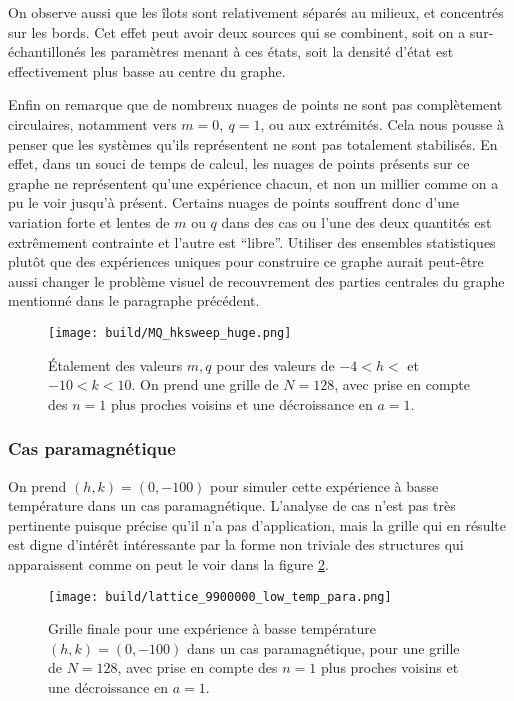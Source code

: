 \documentclass[a4paper, 11pt]{article}
\begin{document}
On observe aussi que les îlots sont relativement séparés au milieux, et concentrés sur les bords.
Cet effet peut avoir deux sources qui se combinent, soit on a sur-échantillonés les paramètres
menant à ces états, soit la densité d'état est effectivement plus basse au centre du graphe. 

Enfin on remarque que de nombreux nuages de points  ne sont pas complètement circulaires,  notamment
vers $m=0, ~q=1$, ou aux extrémités. Cela nous pousse à penser que les systèmes qu'ils représentent
ne sont pas totalement stabilisés. En effet, dans un souci de temps de calcul, les nuages de points
présents sur ce graphe ne représentent qu'une expérience chacun, et non un millier comme on a pu le
voir jusqu'à présent. Certains nuages de points souffrent donc d'une variation forte et lentes de
$m$ ou $q$ dans des cas ou l'une des deux quantités est extrêmement contrainte et l'autre est
``libre''. Utiliser des ensembles statistiques plutôt que des expériences uniques pour construire ce
graphe aurait peut-être aussi changer le problème visuel de recouvrement des parties centrales du
graphe mentionné dans le paragraphe précédent. 


\begin{figure}  
    \centering
    \texttt{[image: build/MQ\_hksweep\_huge.png]}
    \caption{Étalement des valeurs $m, q$ pour des valeurs de $-4 < h < $ et $-10 < k < 10$. On
    prend une grille de $N=128$, avec prise en compte des $n=1$ plus proches voisins et une 
    décroissance en $a=1$.}
    \label{fig:hksweep_huge}
\end{figure}

\subsubsection{Cas paramagnétique}

On prend  $(h, k) = (0, -100)$ pour simuler cette expérience à basse température dans un cas
paramagnétique. L'analyse de cas n'est pas très pertinente puisque \cite{wiki:XY_model} précise
qu'il n'a pas d'application, mais la grille qui en résulte est digne d'intérêt intéressante par la forme
non triviale des structures qui apparaissent comme on peut le voir dans la figure
\ref{fig:low_en_para_corr}. 

\begin{figure}
    \centering
    \texttt{[image: build/lattice\_9900000\_low\_temp\_para.png]} 
    \caption{Grille finale pour une expérience à basse température $(h, k) = (0, -100)$ dans un cas
    paramagnétique, pour une grille de $N=128$, avec prise en compte des $n=1$ plus proches voisins
    et une décroissance en $a=1$.} 
    \label{fig:low_en_para_corr}
\end{figure}
\end{document}
